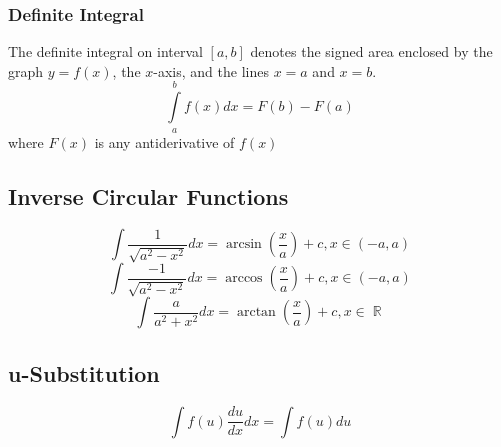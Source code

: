 \documentclass[a4paper,twoside]{article}
\DeclareMathOperator\R{\mathbb{R}}
\begin{document}
			\subsubsection{Definite Integral}
				The definite integral on interval $[a,b]$ denotes the signed area enclosed by the graph $y=f(x)$, the $x$-axis, and the lines $x=a$ and $x=b$.
				\[
					\int\limits_{a}^{b}f(x)dx=F(b)-F(a)
				\]
				where $F(x)$ is any antiderivative of $f(x)$
		\subsection{Inverse Circular Functions}
			\[
				\int\frac{1}{\sqrt{a^2-x^2}}dx=\arcsin\left(\frac{x}{a}\right)+c,x\in(-a,a)
			\]
			\[
				\int\frac{-1}{\sqrt{a^2-x^2}}dx=\arccos\left(\frac{x}{a}\right)+c,x\in(-a,a)
			\]
			\[
				\int\frac{a}{a^2+x^2}dx=\arctan\left(\frac{x}{a}\right)+c,x\in\R
			\]
		\subsection{u-Substitution}
			\[
				\int f(u)\frac{du}{dx}dx=\int f(u)du
			\]
\end{document}
